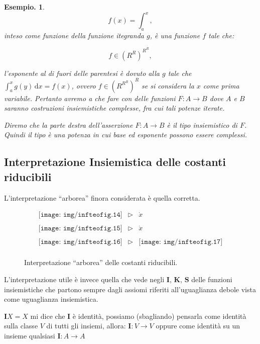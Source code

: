 \documentclass{book}
\newtheorem{esempio}{Esempio.}
\newcommand*{\ii}{\mathbf{I}}    %
\newcommand*{\kk}{\mathbf{K}}    %
\newcommand*{\sss}{\mathbf{S}}   %
\begin{document}
\begin{esempio}
\[
f(x) = \int_{a}^{x},
\]
 inteso come funzione della funzione itegranda $g$, \`e una funzione $f$ tale 
che:

\[
f \in (R^R)^{R^{R}},
\]


l'esponente al di fuori delle parentesi \`e dovuto alla $g$
tale che $\int_{a}^{x}g(y) \, \mathrm{d} x = f(x)$,
ovvero $f \in (R^{R^{R}})^R$ se si considera la $x$ come prima variabile.
Pertanto avremo a che fare con delle funzioni $F: A \longrightarrow B$ dove
$A$ e $B$ saranno costruzioni insiemistiche complesse, fra cui tali potenze
iterate.

Diremo che la parte destra dell'asserzione $F: A \longrightarrow B$ \`e il
tipo insiemistico di $F$. Quindi il tipo \`e una potenza in cui base ed
esponente possono essere complessi.
\end{esempio}

\subsection{Interpretazione Insiemistica delle costanti riducibili}
L'interpretazione ``arborea'' finora considerata \`e quella corretta.
\begin{figure}
\[
\begin{array}{ccc}
\texttt{[image: img/infteofig.14]}  & \vartriangleright & \dot{x} \\
\\

\texttt{[image: img/infteofig.15]}  & \vartriangleright & \dot{x} \\
\\

\texttt{[image: img/infteofig.16]}  & \vartriangleright &
\texttt{[image: img/infteofig.17]} \\
\end{array}
\]
\caption{Interpretazione ``arborea'' delle costanti riducibili.}
\end{figure}
L'interpretazione utile \`e invece quella che vede negli $\ii$, $\kk$, $\sss$ 
delle funzioni insiemistiche che partono sempre dagli assiomi riferiti
all'uguaglianza debole vista come uguaglianza insiemistica.

$\ii X = X$ mi dice che $\ii$ \`e identit\`a, 
possiamo (sbagliando) pensarla come identit\`a sulla classe $V$ di tutti gli 
insiemi, allora: $\ii\colon V \to V$ oppure come identit\`a su un 
insieme qualsiasi $\ii\colon A \to A$
\end{document}

